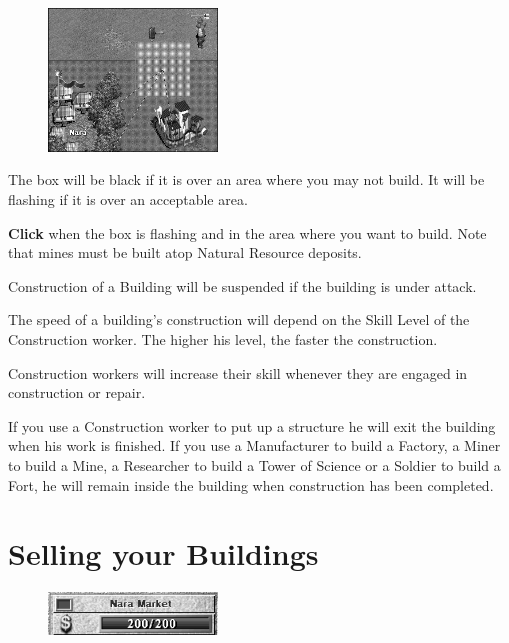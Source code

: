 \begin{figure}
	\vspace{-20pt}
	\begin{center}
		\includegraphics[width=0.4\textwidth]{Ibuildbox}
	\end{center}
	\vspace{-20pt}
\end{figure}

The box will be black if it is over an area where you may not build. It will be flashing if it is over an acceptable area.

\textbf{Click} when the box is flashing and in the area where you want to build. Note that mines must be built atop Natural Resource deposits. 

Construction of a Building will be suspended if the building is under attack.

The speed of a building’s construction will depend on the Skill Level of the Construction worker. The higher his level, the faster the construction.

Construction workers will increase their skill whenever they are engaged in construction or repair.

If you use a Construction worker to put up a structure he will exit the building when his work is finished. If you use a Manufacturer to build a Factory, a Miner to build a Mine, a Researcher to build a Tower of Science or a Soldier to build a Fort, he will remain inside the building when construction has been completed.

\section{Selling your Buildings}


\begin{figure}
	\vspace{-20pt}
	\begin{center}
		\includegraphics[width=0.4\textwidth]{Ifullheath_building}
	\end{center}
	\vspace{-20pt}
\end{figure}

